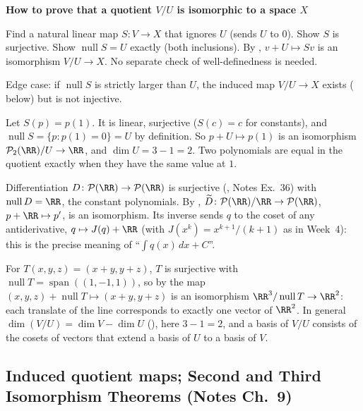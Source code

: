 \documentclass[10pt]{scrartcl}
\DeclareMathOperator{\spn}{span}\DeclareMathOperator{\nul}{null}\DeclareMathOperator{\range}{range}
\newcommand{\PP}{\mathcal P}\newcommand{\LL}{\mathcal L}\newcommand{\MM}{\mathcal M}\newcommand{\T}{\mathsf T}
\newenvironment{methodbox}[1]{\begin{mdframed}[style=methodstyle]\textbf{\color{NavyBlue}#1}\par\vspace{2pt}}{\end{mdframed}}
\begin{document}
\begin{methodbox}{How to prove that a quotient $V/U$ is isomorphic to a space $X$}
  \begin{steps}
    \ii Find a natural linear map $S\colon V\to X$ that ignores $U$ (sends $U$ to $0$).
    \ii Show $S$ is surjective.
    \ii Show $\nul S=U$ exactly (both inclusions).
    \ii By , $v+U\mapsto Sv$ is an isomorphism $V/U\to X$. No separate check of well-definedness is needed.
  \end{steps}
  Edge case: if $\nul S$ is strictly larger than $U$, the induced map $V/U\to X$ exists ( below) but is not injective.
\end{methodbox}

\begin{example*}[$\PP_2(\RR)/\{p:p(1)=0\}\cong\RR$]
  Let $S(p)=p(1)$. It is linear, surjective ($S(c)=c$ for constants), and $\nul S=\{p:p(1)=0\}=U$ by definition. So $p+U\mapsto p(1)$ is an isomorphism $\PP_2(\RR)/U\to\RR$, and $\dim U=3-1=2$. Two polynomials are equal in the quotient exactly when they have the same value at $1$.
\end{example*}

\begin{example*}
  Differentiation $D\colon\PP(\RR)\to\PP(\RR)$ is surjective (, Notes Ex.~36) with $\nul D=\RR$, the constant polynomials. By , $\widetilde D\colon\PP(\RR)/\RR\to\PP(\RR)$, $p+\RR\mapsto p'$, is an isomorphism. Its inverse sends $q$ to the coset of any antiderivative, $q\mapsto J(q)+\RR$ (with $J(x^k)=x^{k+1}/(k+1)$ as in Week~4): this is the precise meaning of ``$\int q(x)\,dx+C$''.
\end{example*}

\revisit For $T(x,y,z)=(x+y,y+z)$, $T$ is surjective with $\nul T=\spn((1,-1,1))$, so by  the map $(x,y,z)+\nul T\mapsto(x+y,y+z)$ is an isomorphism $\RR^3/\nul T\to\RR^2$: each translate of the line corresponds to exactly one vector of $\RR^2$. In general $\dim(V/U)=\dim V-\dim U$ (), here $3-1=2$, and a basis of $V/U$ consists of the cosets of vectors that extend a basis of $U$ to a basis of $V$.

\subsection{Induced quotient maps; Second and Third Isomorphism Theorems (Notes Ch.~9)}
\end{document}
